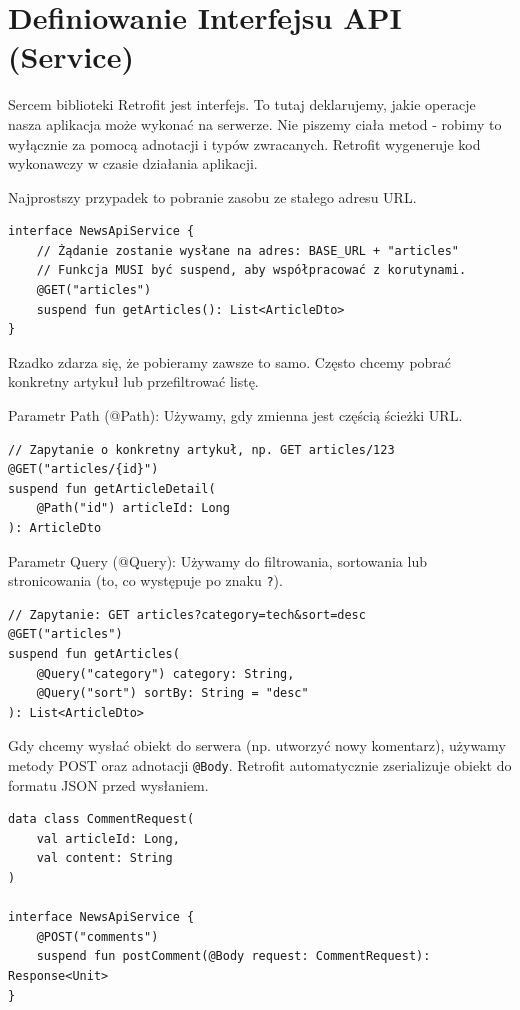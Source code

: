 \section{Definiowanie Interfejsu API (Service)}

Sercem biblioteki Retrofit jest interfejs. To tutaj deklarujemy, jakie operacje nasza aplikacja może wykonać na serwerze. Nie piszemy ciała metod - robimy to wyłącznie za pomocą adnotacji i typów zwracanych. Retrofit wygeneruje kod wykonawczy w czasie działania aplikacji.

Najprostszy przypadek to pobranie zasobu ze stałego adresu URL.

\begin{verbatim}
interface NewsApiService {
    // Żądanie zostanie wysłane na adres: BASE_URL + "articles"
    // Funkcja MUSI być suspend, aby współpracować z korutynami.
    @GET("articles")
    suspend fun getArticles(): List<ArticleDto>
}
\end{verbatim}

Rzadko zdarza się, że pobieramy zawsze to samo. Często chcemy pobrać konkretny artykuł lub przefiltrować listę.

Parametr Path (@Path):
Używamy, gdy zmienna jest częścią ścieżki URL.
\begin{verbatim}
// Zapytanie o konkretny artykuł, np. GET articles/123
@GET("articles/{id}")
suspend fun getArticleDetail(
    @Path("id") articleId: Long
): ArticleDto
\end{verbatim}

Parametr Query (@Query):
Używamy do filtrowania, sortowania lub stronicowania (to, co występuje po znaku \texttt{?}).
\begin{verbatim}
// Zapytanie: GET articles?category=tech&sort=desc
@GET("articles")
suspend fun getArticles(
    @Query("category") category: String,
    @Query("sort") sortBy: String = "desc"
): List<ArticleDto>
\end{verbatim}

Gdy chcemy wysłać obiekt do serwera (np. utworzyć nowy komentarz), używamy metody POST oraz adnotacji \texttt{@Body}. Retrofit automatycznie zserializuje obiekt do formatu JSON przed wysłaniem.

\begin{verbatim}
data class CommentRequest(
    val articleId: Long,
    val content: String
)

interface NewsApiService {
    @POST("comments")
    suspend fun postComment(@Body request: CommentRequest): Response<Unit>
}
\end{verbatim}

